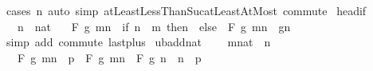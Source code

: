 \begin{isabellebody}
\ {\isacharparenleft}{\kern0pt}cases\ n{\isacharparenright}{\kern0pt}\ {\isacharparenleft}{\kern0pt}auto\ simp{\isacharcolon}{\kern0pt}\ atLeastLessThanSuc{\isacharunderscore}{\kern0pt}atLeastAtMost\ commute{\isacharparenright}{\kern0pt}%
\endisatagproof
{\isafoldproof}%
%
\isadelimproof
\isanewline
%
\endisadelimproof
\isanewline
{}\isamarkupfalse%
\ head{\isacharunderscore}{\kern0pt}if{\isacharcolon}{\kern0pt}\isanewline
\ \ \ n\ {\isacharcolon}{\kern0pt}{\isacharcolon}{\kern0pt}\ nat\isanewline
\ \ \ {\isachardoublequoteopen}F\ g\ {\isacharbraceleft}{\kern0pt}m{\isachardot}{\kern0pt}{\isachardot}{\kern0pt}n{\isacharbraceright}{\kern0pt}\ {\isacharequal}{\kern0pt}\ {\isacharparenleft}{\kern0pt}if\ n\ {\isacharless}{\kern0pt}\ m\ then\ \ else\ \ F\ g\ {\isacharbraceleft}{\kern0pt}m{\isachardot}{\kern0pt}{\isachardot}{\kern0pt}{\isacharless}{\kern0pt}n{\isacharbraceright}{\kern0pt}\ \isactrlbold {\isacharasterisk}{\kern0pt}\ g{\isacharparenleft}{\kern0pt}n{\isacharparenright}{\kern0pt}{\isacharparenright}{\kern0pt}{\isachardoublequoteclose}\isanewline
%
\isadelimproof
\ \ %
\endisadelimproof
%
\isatagproof
{}\isamarkupfalse%
\ {\isacharparenleft}{\kern0pt}simp\ add{\isacharcolon}{\kern0pt}\ commute\ last{\isacharunderscore}{\kern0pt}plus{\isacharparenright}{\kern0pt}%
\endisatagproof
{\isafoldproof}%
%
\isadelimproof
\isanewline
%
\endisadelimproof
\isanewline
{}\isamarkupfalse%
\ ub{\isacharunderscore}{\kern0pt}add{\isacharunderscore}{\kern0pt}nat{\isacharcolon}{\kern0pt}\ \isanewline
\ \ \ {\isachardoublequoteopen}{\isacharparenleft}{\kern0pt}m{\isacharcolon}{\kern0pt}{\isacharcolon}{\kern0pt}nat{\isacharparenright}{\kern0pt}\ {\isasymle}\ n\ {\isacharplus}{\kern0pt}\ {}{\isachardoublequoteclose}\isanewline
\ \ \ {\isachardoublequoteopen}F\ g\ {\isacharbraceleft}{\kern0pt}m{\isachardot}{\kern0pt}{\isachardot}{\kern0pt}n\ {\isacharplus}{\kern0pt}\ p{\isacharbraceright}{\kern0pt}\ {\isacharequal}{\kern0pt}\ F\ g\ {\isacharbraceleft}{\kern0pt}m{\isachardot}{\kern0pt}{\isachardot}{\kern0pt}n{\isacharbraceright}{\kern0pt}\ \isactrlbold {\isacharasterisk}{\kern0pt}\ F\ g\ {\isacharbraceleft}{\kern0pt}n\ {\isacharplus}{\kern0pt}\ {}{\isachardot}{\kern0pt}{\isachardot}{\kern0pt}n\ {\isacharplus}{\kern0pt}\ p{\isacharbraceright}{\kern0pt}{\isachardoublequoteclose}\isanewline
%
\isadelimproof
%
\endisadelimproof
%
\isatagproof
{}\isamarkupfalse%
{\isacharminus}{\kern0pt}\isanewline

\end{isabellebody}
